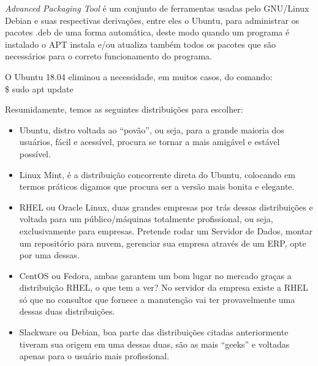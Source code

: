 \begin{dica} \textit{Advanced Packaging Tool} é um conjunto de ferramentas usadas pelo GNU/Linux Debian e suas respectivas derivações, entre eles o Ubuntu, para administrar os pacotes .deb de uma forma automática, deste modo quando um programa é instalado o APT instala e/ou atualiza também todos os pacotes que são necessários para o correto funcionamento do programa.
	
O Ubuntu 18.04 eliminou a necessidade, em muitos casos, do comando: \\
{\ttfamily\$ sudo apt update}
\end{dica}

Resumidamente, temos as seguintes distribuições para escolher: \vspace{-1em}
\begin{itemize}[noitemsep]
 \item Ubuntu, distro voltada ao ``povão'', ou seja, para a grande maioria dos usuários, fácil e acessível, procura se tornar a mais amigável e estável possível.
 \item Linux Mint, é a distribuição concorrente direta do Ubuntu, colocando em termos práticos digamos que procura ser a versão mais bonita e elegante. 
 \item RHEL ou Oracle Linux, duas grandes empresas por trás dessas distribuições e voltada para um público/máquinas totalmente profissional, ou seja, exclusivamente para empresas. Pretende rodar um Servidor de Dados, montar um repositório para nuvem, gerenciar sua empresa através de um ERP, opte por uma dessas.
 \item CentOS ou Fedora, ambas garantem um bom lugar no mercado graças a distribuição RHEL, o que tem a ver? No servidor da empresa existe a RHEL só que no consultor que fornece a manutenção vai ter provavelmente uma dessas duas distribuições.
 \item Slackware ou Debian, boa parte das distribuições citadas anteriormente tiveram sua origem em uma dessas duas, são as mais ``geeks'' e voltadas apenas para o usuário mais profissional.
\end{itemize}


